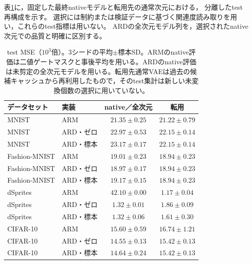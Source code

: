 \documentclass[11pt,a4paper]{ltjsarticle}
\begin{document}
表\ref{tab:newtest}に，固定した最終nativeモデルと転用先の通常次元における，
分離したtest再構成を示す。
選択には制約または検証データに基づく関連度読み取りを用い，これらのtest指標は用いない。
ARDの全次元モデル列を，選択されたnative次元での品質と明確に区別する。
\begin{table}[H]
\caption{test MSE（$10^3$倍）。3シードの平均$\pm$標本SD。ARMのnative評価は二値ゲートマスクと事後平均を用いる。ARDのnative評価は未剪定の全次元モデルを用いる。転用先通常VAEは過去の候補キャッシュから再利用したもので，そのtest集計は新しい未変換個数の選択に用いていない。}\label{tab:newtest}
\small
\setlength{\tabcolsep}{3pt}
\begin{tabular*}{\textwidth}{@{\extracolsep{\fill}}llcc@{}}
\toprule
データセット & 実装 & native／全次元 & 転用 \\
\midrule
MNIST & ARM & $21.35 \pm 0.25$ & $21.22 \pm 0.79$ \\
MNIST & ARD・ゼロ & $22.97 \pm 0.53$ & $22.15 \pm 0.14$ \\
MNIST & ARD・標本 & $23.17 \pm 0.17$ & $22.15 \pm 0.14$ \\
Fashion-MNIST & ARM & $19.01 \pm 0.23$ & $18.94 \pm 0.23$ \\
Fashion-MNIST & ARD・ゼロ & $18.97 \pm 0.17$ & $18.94 \pm 0.23$ \\
Fashion-MNIST & ARD・標本 & $19.17 \pm 0.15$ & $18.94 \pm 0.23$ \\
dSprites & ARM & $42.10 \pm 0.00$ & $1.17 \pm 0.04$ \\
dSprites & ARD・ゼロ & $1.32 \pm 0.01$ & $1.86 \pm 0.09$ \\
dSprites & ARD・標本 & $1.32 \pm 0.06$ & $1.61 \pm 0.30$ \\
CIFAR-10 & ARM & $15.60 \pm 0.59$ & $16.74 \pm 1.21$ \\
CIFAR-10 & ARD・ゼロ & $14.55 \pm 0.13$ & $15.42 \pm 0.13$ \\
CIFAR-10 & ARD・標本 & $14.64 \pm 0.24$ & $15.42 \pm 0.13$ \\
\bottomrule\end{tabular*}
\end{table}
\end{document}
